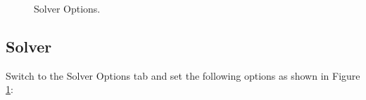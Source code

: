 \documentclass[11pt]{article}
\begin{document}
\begin{figure}[H]
	\centering
	\caption{\label{fig:solver_options}Solver Options.}
\end{figure}

\subsection{Solver}
\label{sec:solver}

Switch to the Solver Options tab and set the following options as shown in Figure \ref{fig:solver_options}:
\end{document}
